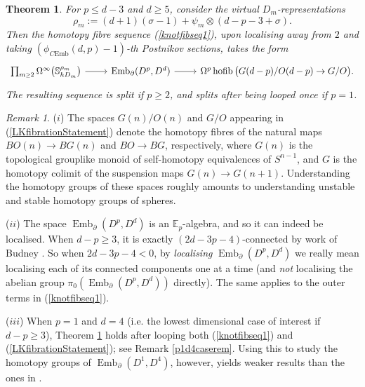 \documentclass[a4paper, oneside]{amsart}
\newcommand{\emb}{\operatorname{Emb}}
\newcommand{\hofib}{\operatorname{hofib}}
\newcommand{\cemb}{C\mathrm{Emb}}
\newcommand{\1}{\mathds{1}}
\newtheorem{thmx}{Theorem}
\theoremstyle{remark}
\newtheorem{rem}[thm]{Remark}%
\theoremstyle{definition}
\newcommand{\geqs}{\scaleobj{0.85}{\geq}}
\newcommand{\s}{\mathbb{S}}
\numberwithin{equation}{section}
\begin{document}
\begin{thmx}\label{LongKnotsThm}
   For $p\leq d-3$ and $d\geq 5$, consider the virtual $D_m$-representations
$$
    \rho_m:=(d+1)(\sigma-1)+\psi_m\otimes(d-p-3+\sigma).
$$  
    Then the homotopy fibre sequence (\ref{knotfibseq1}), upon localising away from $2$ and taking $(\phi_{\cemb}(d,p)-1)$-th Postnikov sections, takes the form
 \begin{equation}\label{LKfibrationStatement}
 \begin{tikzcd}
\prod_{m\geqs 2} \Omega^{\infty}\big(\s^{\rho_m}_{hD_m}\big)\rar&\emb_\partial(D^p, D^d)\rar&\Omega^{p}\hofib\big(G(d-p)/O(d-p)\to G/O\big).
\end{tikzcd}
   \end{equation}
    The resulting sequence is split if $p\geq 2$, and splits after being looped once if $p=1$.
\end{thmx}

\begin{rem}\label{thmBrem}
    ($i$)\hspace{1.5pt} The spaces $G(n)/O(n)$ and $G/O$ appearing in (\ref{LKfibrationStatement}) denote the homotopy fibres of the natural maps $BO(n)\to BG(n)$ and $BO\to BG$, respectively, where $G(n)$ is the topological grouplike monoid of self-homotopy equivalences of $S^{n-1}$, and $G$ is the homotopy colimit of the suspension maps $G(n)\to G(n+1)$. Understanding the homotopy groups of these spaces roughly amounts to understanding unstable and stable homotopy groups of spheres.

    \noindent ($ii$)\hspace{1.5pt} The space $\emb_\partial(D^p,D^d)$ is an $\mathbb{E}_p$-algebra, and so it can indeed be localised. When $d-p\geq 3$, it is exactly $(2d-3p-4)$-connected by work of Budney \cite[Prop. 3.9]{BudneyIntegralLongKnots}. So when $2d-3p-4<0$, by \textit{localising} $\emb_\partial(D^p,D^d)$ we really mean localising each of its connected components one at a time (and \emph{not} localising the abelian group $\pi_0(\emb_\partial(D^p,D^d))$ directly). The same applies to the outer terms in (\ref{knotfibseq1}).


    \noindent ($iii$) When $p=1$ and $d=4$ (i.e. the lowest dimensional case of interest if $d-p\geq 3$), Theorem \ref{LongKnotsThm} holds after looping both (\ref{knotfibseq1}) and (\ref{LKfibrationStatement}); see Remark \ref{p1d4caserem}. Using this to study the homotopy groups of $\emb_\partial(D^1,D^4)$, however, yields weaker results than the ones in \cite[Prop. 3.9]{BudneyIntegralLongKnots}.
\end{rem}
\end{document}
